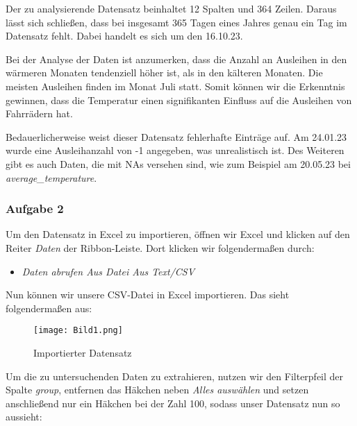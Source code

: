 \documentclass[a4paper, 12pt]{article}
\begin{document}
Der zu analysierende Datensatz beinhaltet 12 Spalten und 364 Zeilen. Daraus lässt 
sich schließen, dass bei insgesamt 365 Tagen eines Jahres genau ein Tag im Datensatz fehlt. Dabei handelt es sich um den 16.10.23.

Bei der Analyse der Daten ist anzumerken, dass die Anzahl an Ausleihen in den 
wärmeren Monaten tendenziell höher ist, als in den kälteren Monaten. Die meisten 
Ausleihen finden im Monat Juli statt. Somit können wir die Erkenntnis gewinnen, 
dass die Temperatur einen signifikanten Einfluss auf die Ausleihen von Fahrrädern 
hat.

Bedauerlicherweise weist dieser Datensatz fehlerhafte Einträge auf. Am 24.01.23 
wurde eine Ausleihanzahl von -1 angegeben, was unrealistisch ist. 
Des Weiteren gibt es auch Daten, die mit NAs versehen sind, wie zum Beispiel am 
20.05.23 bei \textit{average\_temperature}.

\vspace{\baselineskip} 

\subsubsection{Aufgabe 2}
Um den Datensatz in Excel zu importieren, öffnen wir Excel und klicken 
auf den Reiter \textit{Daten} der Ribbon-Leiste. Dort klicken wir folgendermaßen 
durch:

\vspace{\baselineskip} 

\begin{itemize}
   
 \item \textit{Daten abrufen \rightarrow Aus Datei \rightarrow Aus Text/CSV}
\end{itemize}

\vspace{\baselineskip} 

Nun können wir unsere CSV-Datei in Excel importieren. Das sieht folgendermaßen aus:

\vspace{\baselineskip}

\begin{figure}[ht]
    \centering
    \texttt{[image: Bild1.png]}
    \par Importierter Datensatz
\end{figure}

\vspace{\baselineskip}

Um die zu untersuchenden Daten zu extrahieren, nutzen wir den Filterpfeil der 
Spalte \textit{group}, entfernen das Häkchen neben \textit{Alles auswählen} und 
setzen anschließend nur ein Häkchen bei der Zahl 100, sodass unser Datensatz nun so 
aussieht:
\end{document}
